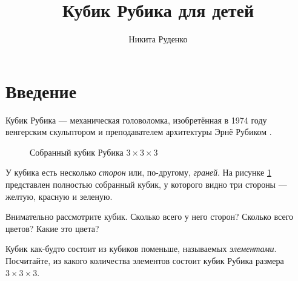


\author{Никита Руденко}
\title{Кубик Рубика для детей}
\date{}


\renewcommand{\RubikCubeSolved}{\RubikSolvedConfig{G}{B}{Y}{W}{R}{O}}


\maketitle

\section{Введение}

Кубик Рубика — механическая головоломка, изобретённая в 1974 году венгерским скульптором и преподавателем архитектуры Эрнё Рубиком \cite{wiki:cube}.

\begin{figure}[h]
    \centering
    \RubikCubeSolved
    \caption{Собранный кубик Рубика $3\times 3\times 3$}
    \label{fig:solved}
\end{figure}

У кубика есть несколько \emph{сторон} или, по-другому, \emph{граней}.
На рисунке \ref{fig:solved} представлен полностью собранный кубик, у которого видно три стороны --- желтую, красную и зеленую.

\begin{exercise}
    Внимательно рассмотрите кубик.
    Сколько всего у него сторон?
    Сколько всего цветов?
    Какие это цвета?
\end{exercise}



\begin{exercise}
    Кубик как-будто состоит из кубиков поменьше, называемых \emph{элементами}.
    Посчитайте, из какого количества элементов состоит кубик Рубика размера $3\times 3\times 3$.
\end{exercise}


